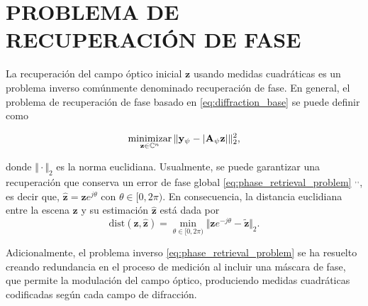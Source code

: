 

\section{PROBLEMA DE RECUPERACIÓN DE FASE}

La recuperación del campo óptico inicial $\mathbf{z}$ usando medidas cuadráticas es un problema inverso comúnmente denominado recuperación de fase. En general, el problema de recuperación de fase basado en \eqref{eq:diffraction_base} se puede definir como 

\begin{equation}
    \operatorname*{minimizar}_{\mathbf{z}\in\mathbb{C}^n}\Vert\mathbf{y}_{\psi} - \vert \mathbf{A}_{\psi}\mathbf{z} \vert\Vert_2^2, 
    \label{eq:phase_retrieval_problem}
\end{equation}

donde $\Vert \cdot\Vert_2$ es la norma euclidiana. Usualmente, se puede garantizar una recuperación que conserva un error de fase global \eqref{eq:phase_retrieval_problem} $^,$$^,$, es decir que, $\hat{\mathbf{z}} = \hat{\mathbf{z}}e^{j\theta}$ con $\theta \in [0, 2\pi)$. En consecuencia, la distancia euclidiana entre la escena $\mathbf{z}$ y su estimación $\hat{\mathbf{z}}$ está dada por
\begin{equation}
    \mathrm{dist}(\mathbf{z}, \hat{\mathbf{z}}) = \min_{\theta \in [0, 2\pi)}\Vert \mathbf{z}e^{-j\theta} - \tilde{\mathbf{z}}\Vert_2.
\end{equation}

Adicionalmente, el problema inverso \eqref{eq:phase_retrieval_problem} se ha resuelto creando redundancia en el proceso de medición al incluir una máscara de fase, que permite la modulación del campo óptico, produciendo medidas cuadráticas codificadas según cada campo de difracción.


